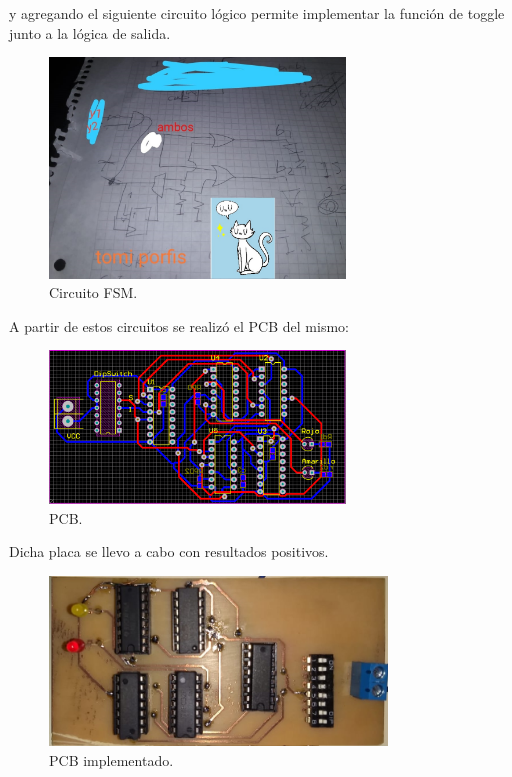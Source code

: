 y agregando el siguiente circuito lógico permite implementar la función de toggle junto a la lógica de salida.
 \begin{figure}[H]
	\centering
	\includegraphics[width=0.7\textwidth]{ImagenesEjercicio1/post_logic.jpeg}
	\caption{Circuito FSM.}
	\label{fig:fsm}
\end{figure}
A partir de estos circuitos se realizó el PCB del mismo:
 \begin{figure}[H]
	\centering
	\includegraphics[width=0.7\textwidth]{ImagenesEjercicio1/PCB.PNG}
	\caption{PCB.}
	\label{fig:fsm}
\end{figure}
Dicha placa se llevo a cabo con resultados positivos.
 \begin{figure}[H]
	\centering
	\includegraphics[width=0.8\textwidth]{ImagenesEjercicio1/pcbReal.jpeg}
	\caption{PCB implementado.}
	\label{fig:fsm}
\end{figure}
